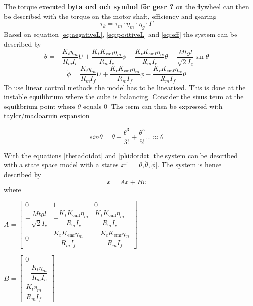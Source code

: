 \documentclass[a4paper,11pt]{kth-mag}
\begin{document}
The torque executed \textbf{byta ord  och symbol för gear ?} on the flywheel can then be described with the torque on the motor shaft, efficiency and gearing.
\begin{equation} \label{eq:eff}
\tau_k = \tau_m \cdot \eta_m \cdot \eta_g \cdot \Gamma
\end{equation}
Based on equation \eqref{eq:negativeL}, \eqref{eq:positiveL} and \eqref{eq:eff} the system can be described by
\begin{equation}
\ddot{\theta} = -\frac{K_t \eta_m}{R_m I_c} U + \frac{K_t K_{\text{emf}} \eta_m}{R_m I_c} \dot{\phi} - \frac{K_t K_{\text{emf}} \eta_m}{R_m I_c} \dot{\theta} - \frac{Mt g l }{\sqrt{2} I_c} \sin \theta \label{thetadotdot}
\end{equation}
\begin{equation}
\ddot{\phi} = \frac{K_t \eta_m}{R_m I_f} U + \frac{K_t K_{\text{emf}} \eta_m}{R_m I_f} \dot{\phi} - \frac{K_t K_{\text{emf}} \eta_m}{R_m I_f} \dot{\theta} 
\label{phidotdot}
\end{equation} 
To use linear control methods the model has to be linearised. This is done at the instable equilibrium where the cube is balancing. Consider the sinus term at the equilibrium point where $\theta$ equals $0$. The term can then be expressed with taylor/macloaruin expansion

\begin{equation} \label{eq: sinus taylor}
sin \theta = \theta - \frac{\theta^3}{3!} +\frac{\theta^5}{5!}... \approx \theta 
\end{equation}

With the equations \eqref{thetadotdot} and \eqref{phidotdot} the system can be described with a state space model with a states $x^T = [\theta, \dot{\theta}, \dot{\phi}$]. The system is hence described by
\begin{equation}
\dot{x} = Ax + Bu
\end{equation} 
where \\
\begin{center}
$A =\begin{bmatrix}
0 & 1 & 0 \\
-\dfrac{Mt g l }{\sqrt{2} I_c} & - \dfrac{K_t K_{\text{emf}} \eta_m}{R_m I_c} & \dfrac{K_t K_{\text{emf}} \eta_m}{R_m I_c} \\ 
0 & \dfrac{K_t K_{\text{emf}} \eta_m}{R_m I_f} & -\dfrac{K_t K_{\text{emf}} \eta_m}{R_m I_f}
\end{bmatrix}$

$B = \begin{bmatrix}
0 \\ 
-\dfrac{K_t \eta_m}{R_m I_c} \\
\dfrac{K_t \eta_m}{R_m I_f}
\end{bmatrix} $
\end{center}
 
\end{document}
